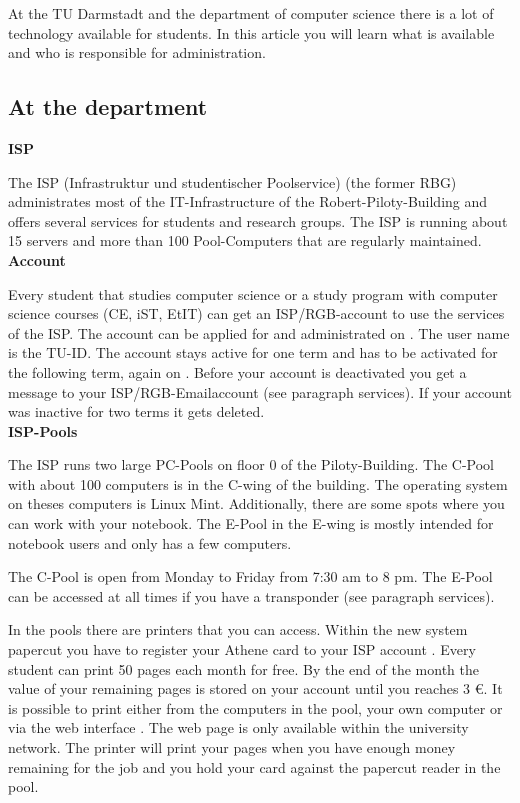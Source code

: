 {At the TU Darmstadt and the department of computer science there is a lot of technology available for students. In this article you will learn what is available and who is responsible for administration.
}{
    \subsection*{At the department}

    \noindent\textbf{ISP}

    The ISP (Infrastruktur und studentischer Poolservice) \footnotemark[1] (the former RBG) administrates most of the IT-Infrastructure of the Robert-Piloty-Building and offers several services for students and research groups. The ISP is running about 15 servers and more than 100 Pool-Computers that are regularly maintained.\\

    \noindent\textbf{Account}

    Every student that studies computer science or a study program with computer science courses (CE, iST, EtIT) can get an ISP/RGB-account to use the services of the ISP. The account can be applied for and administrated on \footnotemark[2]. The user name is the TU-ID. The account stays active for one term and has to be activated for the following term, again on \footnotemark[2]. Before your account is deactivated you get a message to your ISP/RGB-Emailaccount (see paragraph services). If your account was inactive for two terms it gets deleted.\\

    \noindent\textbf{ISP-Pools}

    The ISP runs two large PC-Pools on floor 0 of the Piloty-Building. The C-Pool with about 100 computers is in the C-wing of the building. The operating system on theses computers is Linux Mint. Additionally, there are some spots where you can work with your notebook. The E-Pool in the E-wing is mostly intended for notebook users and only has a few computers.

    The C-Pool is open from Monday to Friday from 7:30 am to 8 pm. The E-Pool can be accessed at all times if you have a transponder (see paragraph services).

    In the pools there are printers that you can access.
    Within the new system papercut you have to register your Athene card to your ISP account \footnotemark[3].
    Every student can print 50 pages each month for free.
    By the end of the month the value of your remaining pages is stored on your account until you reaches 3 \euro.
    It is possible to print either from the computers in the pool, your own computer \footnotemark[3] or via the web interface \footnotemark[4].
    The web page is only available within the university network.
    The printer will print your pages when you have enough money remaining for the job and you hold your card against the papercut reader in the pool.

}
